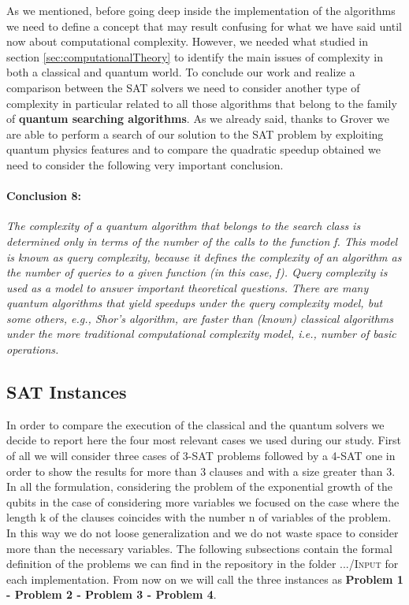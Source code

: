 \documentclass[english]{article}
\begin{document}
		As we mentioned, before going deep inside the implementation of the algorithms we need to define a concept that may result confusing for what we have said until now about computational complexity. However, we needed what studied in section \ref{sec:computationalTheory} to identify the main issues of complexity in both a classical and quantum world. To conclude our work and realize a comparison between the SAT solvers we need to consider another type of complexity in particular related to all those algorithms that belong to the family of \textbf{quantum searching algorithms}. As we already said, thanks to Grover we are able to perform a search of our solution to the SAT problem by exploiting quantum physics features and to compare the quadratic speedup obtained we need to consider the following very important conclusion.
		
		\paragraph{Conclusion 8:} \label{conc:queryCompl} \emph{The complexity of a quantum algorithm that belongs to the search class is determined only in terms of the number of the calls to the function f. This model is known as query complexity, because it defines the complexity of an algorithm as the number of queries to a given function (in this case, f). Query complexity is used as a model to answer important theoretical questions. There are many quantum algorithms that yield speedups under the query complexity model, but some others, e.g., Shor's algorithm, are faster than (known) classical algorithms under the more traditional computational complexity model, i.e., number of basic operations.}
	
		\subsection{SAT Instances}
		\label{sec:satInstances}
			In order to compare the execution of the classical and the quantum solvers we decide to report here the four most relevant cases we used during our study. First of all we will consider three cases of 3-SAT problems followed by a 4-SAT one in order to show the results for more than 3 clauses and with a size greater than 3. In all the formulation, considering the problem of the exponential growth of the qubits in the case of considering more variables we focused on the case where the length k of the clauses coincides with the number n of variables of the problem. In this way we do not loose generalization and we do not waste space to consider more than the necessary variables. The following subsections contain the formal definition of the problems we can find in the repository in the folder \textsc{.../Input} for each implementation. From now on we will call the three instances as \textbf{Problem 1 - Problem 2 - Problem 3 - Problem 4}.
			
\end{document}

